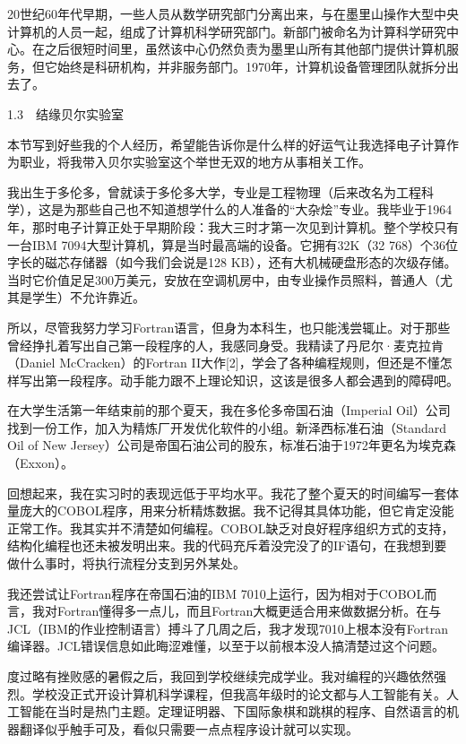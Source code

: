 \documentclass[a4paper,12pt,UTF8,twoside]{ctexbook}
\begin{document}
20世纪60年代早期，一些人员从数学研究部门分离出来，与在墨里山操作大型中央计算机的人员一起，组成了计算机科学研究部门。新部门被命名为计算科学研究中心。在之后很短时间里，虽然该中心仍然负责为墨里山所有其他部门提供计算机服务，但它始终是科研机构，并非服务部门。1970年，计算机设备管理团队就拆分出去了。





1.3　结缘贝尔实验室


本节写到好些我的个人经历，希望能告诉你是什么样的好运气让我选择电子计算作为职业，将我带入贝尔实验室这个举世无双的地方从事相关工作。

我出生于多伦多，曾就读于多伦多大学，专业是工程物理（后来改名为工程科学），这是为那些自己也不知道想学什么的人准备的“大杂烩”专业。我毕业于1964年，那时电子计算正处于早期阶段：我大三时才第一次见到计算机。整个学校只有一台IBM 7094大型计算机，算是当时最高端的设备。它拥有32K（32 768）个36位字长的磁芯存储器（如今我们会说是128 KB），还有大机械硬盘形态的次级存储。当时它价值足足300万美元，安放在空调机房中，由专业操作员照料，普通人（尤其是学生）不允许靠近。

所以，尽管我努力学习Fortran语言，但身为本科生，也只能浅尝辄止。对于那些曾经挣扎着写出自己第一段程序的人，我感同身受。我精读了丹尼尔·麦克拉肯（Daniel McCracken）的Fortran II大作[2]，学会了各种编程规则，但还是不懂怎样写出第一段程序。动手能力跟不上理论知识，这该是很多人都会遇到的障碍吧。

在大学生活第一年结束前的那个夏天，我在多伦多帝国石油（Imperial Oil）公司找到一份工作，加入为精炼厂开发优化软件的小组。新泽西标准石油（Standard Oil of New Jersey）公司是帝国石油公司的股东，标准石油于1972年更名为埃克森（Exxon）。

回想起来，我在实习时的表现远低于平均水平。我花了整个夏天的时间编写一套体量庞大的COBOL程序，用来分析精炼数据。我不记得其具体功能，但它肯定没能正常工作。我其实并不清楚如何编程。COBOL缺乏对良好程序组织方式的支持，结构化编程也还未被发明出来。我的代码充斥着没完没了的IF语句，在我想到要做什么事时，将执行流程分支到另外某处。

我还尝试让Fortran程序在帝国石油的IBM 7010上运行，因为相对于COBOL而言，我对Fortran懂得多一点儿，而且Fortran大概更适合用来做数据分析。在与JCL（IBM的作业控制语言）搏斗了几周之后，我才发现7010上根本没有Fortran编译器。JCL错误信息如此晦涩难懂，以至于以前根本没人搞清楚过这个问题。

度过略有挫败感的暑假之后，我回到学校继续完成学业。我对编程的兴趣依然强烈。学校没正式开设计算机科学课程，但我高年级时的论文都与人工智能有关。人工智能在当时是热门主题。定理证明器、下国际象棋和跳棋的程序、自然语言的机器翻译似乎触手可及，看似只需要一点点程序设计就可以实现。
\end{document}

